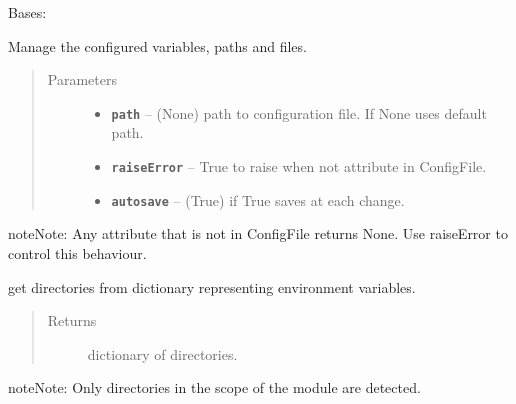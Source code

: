 \documentclass[letterpaper,10pt,english]{sphinxmanual}
\begin{document}
\begin{fulllineitems}
\label{RRtoolbox.lib:RRtoolbox.lib.config.directoryManager}
Bases: 

Manage the configured variables, paths and files.
\begin{quote}\begin{description}
\item[{Parameters}] \leavevmode\begin{itemize}
\item {} 
\textbf{\texttt{path}} -- (None) path to configuration file. If None uses default path.

\item {} 
\textbf{\texttt{raiseError}} -- True to raise when not attribute in ConfigFile.

\item {} 
\textbf{\texttt{autosave}} -- (True) if True saves at each change.

\end{itemize}

\end{description}\end{quote}

\begin{notice}{note}{Note:}
Any attribute that is not in ConfigFile returns None.
Use raiseError to control this behaviour.
\end{notice}

\begin{fulllineitems}
\label{RRtoolbox.lib:RRtoolbox.lib.config.directoryManager.default}
get directories from dictionary representing environment variables.
\begin{quote}\begin{description}
\item[{Returns}] \leavevmode
dictionary of directories.

\end{description}\end{quote}

\begin{notice}{note}{Note:}
Only directories in the scope of the module are detected.
\end{notice}

\end{fulllineitems}


\end{fulllineitems}
\end{document}
